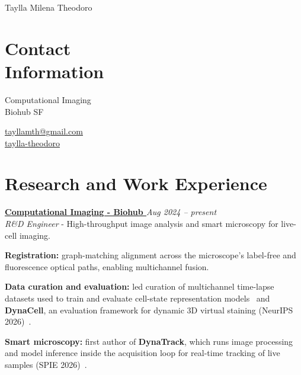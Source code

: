 \documentclass[margin,line]{resume}
\begin{document}
{\large Taylla Milena Theodoro}
\begin{resume}



    \section{\mysidestyle Contact \\Information}
    \begin{minipage}[t]{0.7\textwidth}
        Computational Imaging \\
        Biohub SF\\
    \end{minipage}\hfill
    \begin{minipage}[t]{0.7\textwidth}
        \href{mailto:tayllamth@gmail.com}
        {\underline{tayllamth@gmail.com}} \\
        \href{https://www.linkedin.com/in/taylla-theodoro/}{\underline{taylla-theodoro}} 
    \end{minipage}
   \vspace{-0.2cm}
        \section{\mysidestyle Research and Work Experience} 
        \textbf{\href{https://www.czbiohub.org/comp-micro/people/}{Computational Imaging - Biohub
}} \hfill \textsl{Aug 2024 -- present}  \\
       \textit{R\&D Engineer} - High-throughput image analysis and smart microscopy for live-cell imaging.
       \begin{list2}
        \item \textbf{Registration:} graph-matching alignment across the microscope's label-free and fluorescence optical paths, enabling multichannel fusion.
        \item \textbf{Data curation and evaluation:} led curation of multichannel time-lapse datasets used to train and evaluate cell-state representation models~\cite{pradeep2024contrastivelearningcellstate,hirata2025mapping,hirata-miyasaki2025embedding} and \textbf{DynaCell}, an evaluation framework for dynamic 3D virtual staining (NeurIPS 2026)~\cite{kalinin2026dynacell}.
        \item \textbf{Smart microscopy:} first author of \textbf{DynaTrack}, which runs image processing and model inference inside the acquisition loop for real-time tracking of live samples (SPIE 2026)~\cite{theodoro2026dynatrack}.
       \end{list2}
        \vspace{-0.3cm}


\end{resume}
\end{document}
